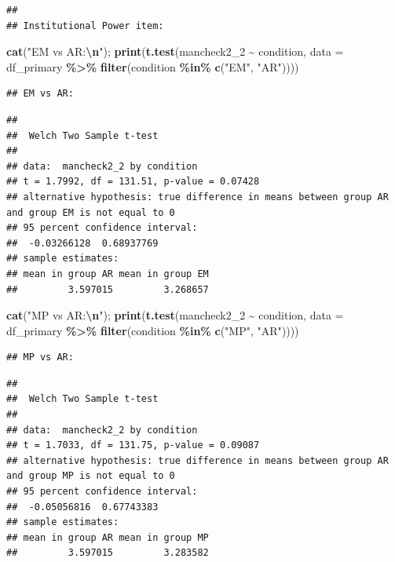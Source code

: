\documentclass[
]{article}
\newenvironment{Shaded}{\begin{snugshade}}{\end{snugshade}}
\newcommand{\AttributeTok}[1]{\textcolor[rgb]{0.13,0.29,0.53}{#1}}
\newcommand{\FunctionTok}[1]{\textcolor[rgb]{0.13,0.29,0.53}{\textbf{#1}}}
\newcommand{\NormalTok}[1]{#1}
\newcommand{\SpecialCharTok}[1]{\textcolor[rgb]{0.81,0.36,0.00}{\textbf{#1}}}
\newcommand{\StringTok}[1]{\textcolor[rgb]{0.31,0.60,0.02}{#1}}
\begin{document}
\begin{verbatim}
## 
## Institutional Power item:
\end{verbatim}

\begin{Shaded}
\begin{Highlighting}[]
\FunctionTok{cat}\NormalTok{(}\StringTok{"EM vs AR:}\SpecialCharTok{\textbackslash{}n}\StringTok{"}\NormalTok{); }\FunctionTok{print}\NormalTok{(}\FunctionTok{t.test}\NormalTok{(mancheck2\_2 }\SpecialCharTok{\textasciitilde{}}\NormalTok{ condition, }
       \AttributeTok{data =}\NormalTok{ df\_primary }\SpecialCharTok{\%\textgreater{}\%} \FunctionTok{filter}\NormalTok{(condition }\SpecialCharTok{\%in\%} \FunctionTok{c}\NormalTok{(}\StringTok{"EM"}\NormalTok{, }\StringTok{"AR"}\NormalTok{))))}
\end{Highlighting}
\end{Shaded}

\begin{verbatim}
## EM vs AR:
\end{verbatim}

\begin{verbatim}
## 
##  Welch Two Sample t-test
## 
## data:  mancheck2_2 by condition
## t = 1.7992, df = 131.51, p-value = 0.07428
## alternative hypothesis: true difference in means between group AR and group EM is not equal to 0
## 95 percent confidence interval:
##  -0.03266128  0.68937769
## sample estimates:
## mean in group AR mean in group EM 
##         3.597015         3.268657
\end{verbatim}

\begin{Shaded}
\begin{Highlighting}[]
\FunctionTok{cat}\NormalTok{(}\StringTok{"MP vs AR:}\SpecialCharTok{\textbackslash{}n}\StringTok{"}\NormalTok{); }\FunctionTok{print}\NormalTok{(}\FunctionTok{t.test}\NormalTok{(mancheck2\_2 }\SpecialCharTok{\textasciitilde{}}\NormalTok{ condition, }
       \AttributeTok{data =}\NormalTok{ df\_primary }\SpecialCharTok{\%\textgreater{}\%} \FunctionTok{filter}\NormalTok{(condition }\SpecialCharTok{\%in\%} \FunctionTok{c}\NormalTok{(}\StringTok{"MP"}\NormalTok{, }\StringTok{"AR"}\NormalTok{))))}
\end{Highlighting}
\end{Shaded}

\begin{verbatim}
## MP vs AR:
\end{verbatim}

\begin{verbatim}
## 
##  Welch Two Sample t-test
## 
## data:  mancheck2_2 by condition
## t = 1.7033, df = 131.75, p-value = 0.09087
## alternative hypothesis: true difference in means between group AR and group MP is not equal to 0
## 95 percent confidence interval:
##  -0.05056816  0.67743383
## sample estimates:
## mean in group AR mean in group MP 
##         3.597015         3.283582
\end{verbatim}
\end{document}
